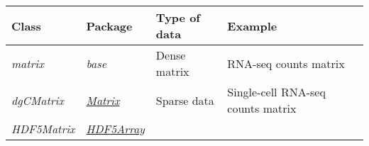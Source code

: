 \documentclass[]{book}
\begin{document}
\begin{longtable}[]{@{}llll@{}}
\toprule
\begin{minipage}[b]{0.10\columnwidth}\raggedright\strut
Class\strut
\end{minipage} & \begin{minipage}[b]{0.28\columnwidth}\raggedright\strut
Package\strut
\end{minipage} & \begin{minipage}[b]{0.25\columnwidth}\raggedright\strut
Type of data\strut
\end{minipage} & \begin{minipage}[b]{0.25\columnwidth}\raggedright\strut
Example\strut
\end{minipage}\tabularnewline
\midrule
\endhead
\begin{minipage}[t]{0.10\columnwidth}\raggedright\strut
\emph{matrix}\strut
\end{minipage} & \begin{minipage}[t]{0.28\columnwidth}\raggedright\strut
\emph{base}\strut
\end{minipage} & \begin{minipage}[t]{0.25\columnwidth}\raggedright\strut
Dense matrix\strut
\end{minipage} & \begin{minipage}[t]{0.25\columnwidth}\raggedright\strut
RNA-seq counts matrix\strut
\end{minipage}\tabularnewline
\begin{minipage}[t]{0.10\columnwidth}\raggedright\strut
\emph{dgCMatrix}\strut
\end{minipage} & \begin{minipage}[t]{0.28\columnwidth}\raggedright\strut
\emph{\href{https://CRAN.R-project.org/package=Matrix}{Matrix}}\strut
\end{minipage} & \begin{minipage}[t]{0.25\columnwidth}\raggedright\strut
Sparse data\strut
\end{minipage} & \begin{minipage}[t]{0.25\columnwidth}\raggedright\strut
Single-cell RNA-seq counts matrix\strut
\end{minipage}\tabularnewline
\begin{minipage}[t]{0.10\columnwidth}\raggedright\strut
\emph{HDF5Matrix}\strut
\end{minipage} & \begin{minipage}[t]{0.28\columnwidth}\raggedright\strut
\emph{\href{http://bioconductor.org/packages/HDF5Array}{HDF5Array}}\strut

\end{minipage}
\end{longtable}
\end{document}
